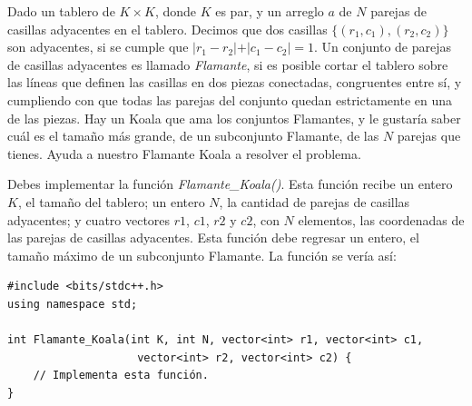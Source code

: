 \documentclass[12pt]{scrartcl}
\begin{document}
    
    
    \vspace{10pt}

    

        Dado un tablero de $K \times K$, donde $K$ es par, y un arreglo $a$ de $N$ parejas de casillas adyacentes en el tablero. Decimos que dos casillas $\{(r_1, c_1), (r_2, c_2)\}$ son adyacentes, si se cumple que $\lvert r_1 - r_2 \lvert + \lvert c_1 - c_2 \lvert = 1$. Un conjunto de parejas de casillas adyacentes es llamado {\itshape Flamante}, si es posible cortar el tablero sobre las líneas que definen las casillas en dos piezas conectadas, congruentes entre sí, y cumpliendo con que todas las parejas del conjunto quedan estrictamente en una de las piezas. Hay un Koala que ama los conjuntos Flamantes, y le gustaría saber cuál es el tamaño más grande, de un subconjunto Flamante, de las $N$ parejas que tienes. Ayuda a nuestro Flamante Koala a resolver el problema.
        

       Debes implementar la función {\itshape Flamante\_Koala()}. Esta función recibe un entero $K$, el tamaño del tablero; un entero $N$, la cantidad de parejas de casillas adyacentes; y cuatro vectores $r1$, $c1$, $r2$ y $c2$,  con $N$ elementos, las coordenadas de las parejas de casillas adyacentes. Esta función debe regresar un entero, el tamaño máximo de un subconjunto Flamante. 
        La función se vería así:

\begin{verbatim}
#include <bits/stdc++.h>
using namespace std;

int Flamante_Koala(int K, int N, vector<int> r1, vector<int> c1,
                    vector<int> r2, vector<int> c2) {
    // Implementa esta función.
}
\end{verbatim}

    
\end{document}
